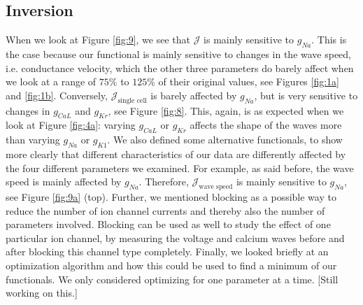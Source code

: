 \documentclass{article}
\begin{document}
\subsection{Inversion} \label{Inversion 2}
%
When we look at Figure \ref{fig:9}, we see that $\mathcal{J}$ is mainly sensitive to $g_{Na}$. This is the case because our functional is mainly sensitive to changes in the wave speed, i.e. conductance velocity, which the other three parameters do barely affect when we look at a range of $75\%$ to $125 \%$ of their original values, see Figures \ref{fig:1a} and \ref{fig:1b}. Conversely, $\mathcal{J}_{\text{single cell}}$ is barely affected by $g_{Na}$, but is very sensitive to changes in $g_{CaL}$ and $g_{Kr}$, see Figure \ref{fig:8}. This, again, is as expected when we look at Figure \ref{fig:4a}: varying $g_{CaL}$ or $g_{Kr}$ affects the shape of the waves more than varying $g_{Na}$ or $g_{K1}$. We also defined some alternative functionals, to show more clearly that different characteristics of our data are differently affected by the four different parameters we examined. For example, as said before, the wave speed is mainly affected by $g_{Na}$. Therefore, $\mathcal{J}_{\text{wave speed}}$ is mainly sensitive to $g_{Na}$, see Figure \ref{fig:9a} (top). Further, we mentioned blocking as a possible way to reduce the number of ion channel currents and thereby also the number of parameters involved. Blocking can be used as well to study the effect of one particular ion channel, by measuring the voltage and calcium waves before and after blocking this channel type completely.
Finally, we looked briefly at an optimization algorithm and how this could be used to find a minimum of our functionals. We only considered optimizing for one parameter at a time. [Still working on this.]
\end{document}
